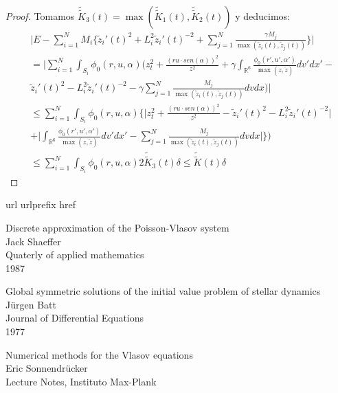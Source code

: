 \documentclass[a4paper,10pt]{scrartcl}
\theoremstyle{definition}
\newcommand{\dtilde}[1]{\widetilde{\widetilde{#1}}}
\numberwithin{equation}{section}
\begin{document}
\begin{proof}
Tomamos $\dtilde{K}_3(t) = \max(\dtilde{K}_1(t), \dtilde{K}_2(t))$ y deducimos:
\begin{align*}
&\Bigg|E - \sum_{i=1}^N M_i\bigg\{\widetilde{z}_i'(t)^2 + L_i^2\widetilde{z}_i'(t)^{-2} + \sum_{j=1}^N \frac{\gamma M_j}{\max(\widetilde{z}_i(t), \widetilde{z}_j(t))}\bigg\} \Bigg| \\
&= \Bigg|\sum_{i=1}^N \int_{S_i} \phi_0(r,u,\alpha) \Bigg(z_t^2 + \frac{(ru\cdot sen(\alpha))^2}{z^2} + \gamma \int_{\mathbb{R}^6} \frac{\phi_0(r',u',\alpha')}{\max(z,\widetilde{z})} dv' dx' - \\
&\widetilde{z}_i'(t)^2 - L_i^2\widetilde{z}_i'(t)^{-2} - \gamma \sum_{j=1}^N \frac{M_j}{\max(\widetilde{z}_i(t), \widetilde{z}_j(t))} dv dx \Bigg)\Bigg| \\
&\le \sum_{i=1}^N \int_{S_i} \phi_0(r,u,\alpha) \Bigg\{\Bigg| z_t^2 + \frac{(ru\cdot sen(\alpha))^2}{z^2} -
\widetilde{z}_i'(t)^2 - L_i^2\widetilde{z}_i'(t)^{-2} \Bigg| \\
&+ \Bigg|\int_{\mathbb{R}^6} \frac{\phi_0(r',u',\alpha')}{\max(z,\widetilde{z})} dv' dx' - \sum_{j=1}^N \frac{M_j}{\max(\widetilde{z}_i(t), \widetilde{z}_j(t))} dv dx \Bigg|\Bigg\}\Bigg) \\
&\le \sum_{i=1}^N \int_{S_i} \phi_0(r,u,\alpha) 2\dtilde{K}_3(t)\delta \le \dtilde{K}(t) \delta
\end{align*}


 \end{proof}


\newpage
\begin{thebibliography}{10}
    \expandafter\ifx\csname url\endcsname\relax
    \def\url#1{\texttt{#1}}\fi
    \expandafter\ifx\csname urlprefix\endcsname\relax\def\urlprefix{URL }\fi
    \expandafter\ifx\csname href\endcsname\relax
    \def\href#1#2{#2} \def\path#1{#1}\fi
    
    Discrete approximation of the Poisson-Vlasov system\\
    Jack Shaeffer\\
    Quaterly of applied mathematics\\
    1987
    
    Global symmetric solutions of the initial value problem of stellar dynamics\\
    Jürgen Batt\\
    Journal of Differential Equations\\
    1977
    
    Numerical methods for the Vlasov equations\\
    Eric Sonnendrücker\\
    Lecture Notes, Instituto Max-Plank
\end{thebibliography}
	
\end{document}

